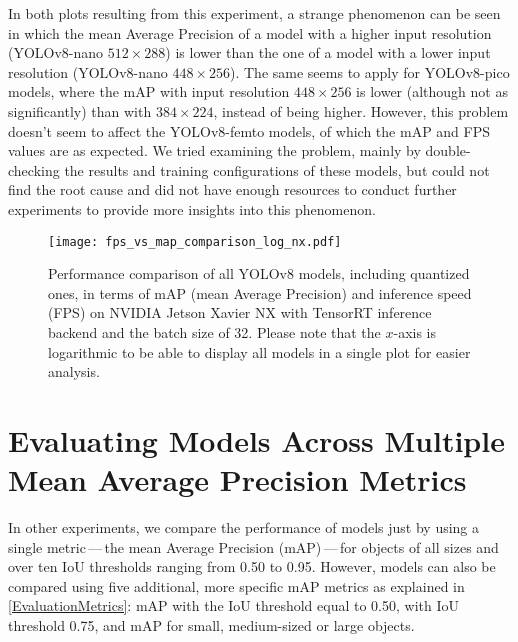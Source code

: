 In both plots resulting from this experiment, a strange phenomenon can be seen
in which the mean Average Precision of a model with a higher input
resolution (YOLOv8-nano $512 \times 288$) is lower than the one of a model
with a lower input resolution (YOLOv8-nano $448 \times 256$). The same seems to apply for
YOLOv8-pico models, where the mAP with input resolution $448 \times 256$ is
lower (although not as significantly) than with $384 \times 224$, instead of
being higher. However, this problem doesn't seem to affect the YOLOv8-femto
models, of which the mAP and FPS values are as expected. We tried examining the
problem, mainly by double-checking the results and training configurations of
these models, but could not find the root cause and did not have enough
resources to conduct further experiments to provide more insights into this
phenomenon.

\begin{figure}[t]
    \begin{framed}
        \centering
        \texttt{[image: fps\_vs\_map\_comparison\_log\_nx.pdf]}
        \caption{Performance comparison of all YOLOv8 models, including
        quantized ones, in terms of mAP (mean Average Precision) and inference
        speed (FPS) on NVIDIA Jetson Xavier NX with TensorRT inference backend
        and the batch size of 32. Please note that the $x$-axis is logarithmic to
        be able to display all models in a single plot for easier analysis.}
        \label{FPSvsmAPComparisonNX}
    \end{framed}
\end{figure}








\section{Evaluating Models Across Multiple Mean Average Precision Metrics}


In other experiments, we compare the performance of models just by
using a single metric\,---\,the mean Average Precision (mAP)\,---\,for objects of all
sizes and over ten IoU thresholds ranging from \num{0.50} to \num{0.95}.
However, models can also be compared using five additional, more specific mAP
metrics as explained in \autoref{EvaluationMetrics}: mAP with the IoU
threshold equal to \num{0.50}, with IoU threshold \num{0.75}, and mAP for small,
medium-sized or large objects.

